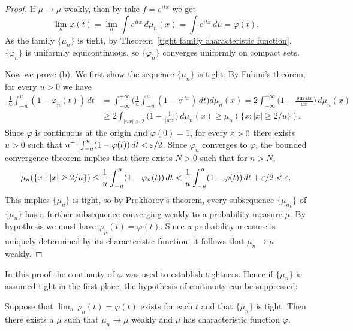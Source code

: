 \begin{proof}
If $\mu\to\mu$ weakly, then by take $f=e^{it x}$ we get
\[\lim_n\varphi(t)=\lim_n\int e^{it x}\,d\mu_n(x)=\int e^{it x}\,d\mu=\varphi(t).\]
As the family $\{\mu_n\}$ is tight, by Theorem~\ref{tight family characteristic function}, $\{\varphi_n\}$ is uniformly equicontinuous, so $\{\varphi_n\}$ converges uniformly on compact sets.\par
Now we prove (b). We first show the sequence $\{\mu_n\}$ is tight. By Fubini's theorem, for every $u>0$ we have
\begin{align*}
\frac{1}{u}\int_{-u}^{u}(1-\varphi_n(t))\,dt&=\int_{-\infty}^{+\infty}\Big(\frac{1}{u}\int_{-u}^{u}(1-e^{itx})\,dt\Big)d\mu_n(x)=2\int_{-\infty}^{+\infty}\Big(1-\frac{\sin ux}{ux}\Big)\,d\mu_n(x)\\
&\geq 2\int_{|ux|>2}\Big(1-\frac{1}{|ux|}\Big)\,d\mu_n(x)\geq \mu_n(\{x:|x|\geq 2/u\}).
\end{align*}
Since $\varphi$ is continuous at the origin and $\varphi(0)=1$, for every $\varepsilon>0$ there exists $u>0$ such that $u^{-1}\int_{-u}^{u}(1-\varphi(t))\,dt<\varepsilon/2$. Since $\varphi_n$ converges to $\varphi$, the bounded convergence theorem implies that there exists $N>0$ such that for $n>N$,
\[\mu_n(\{x:|x|\geq 2/u\})\leq\frac{1}{u}\int_{-u}^{u}(1-\varphi_n(t))\,dt<\frac{1}{u}\int_{-u}^{u}(1-\varphi(t))\,dt+\varepsilon/2<\varepsilon.\]
This implies $\{\mu_n\}$ is tight, so by Prokhorov's theorem, every subsequence $\{\mu_{n_k}\}$ of $\{\mu_n\}$ has a further subsequence converging weakly to a probability measure $\mu$. By hypothesis we must have $\varphi_\mu(t)=\varphi(t)$. Since a probability measure is uniquely determined by its characteristic function, it follows that $\mu_n\to\mu$ weakly.
\end{proof}
In this proof the continuity of $\varphi$ was used to establish tightness. Hence if $\{\mu_n\}$ is assumed tight in the first place, the hypothesis of continuity can be suppressed:
\begin{corollary}
Suppose that $\lim_n\varphi_n(t)=\varphi(t)$ exists for each $t$ and that $\{\mu_n\}$ is tight. Then there exists a $\mu$ such that $\mu_n\to\mu$ weakly and $\mu$ has characteristic function $\varphi$.
\end{corollary}
